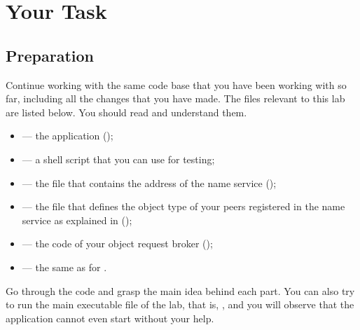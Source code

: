 \documentclass[a4paper]{article}
\begin{document}
\section{Your Task} 
\subsection{Preparation}
Continue working with the same code base that you have been working with so far,
including all the changes that you have made. The files relevant to this lab are
listed below. You should read and understand them.
\begin{itemize}

  \item {} --- the  application (\leave);

  \item {} --- a shell script that you can use for testing;

  \item {} --- the file that
  contains the address of the name service (\leave);

  \item {} --- the file that defines the
  object type of your peers registered in the name service as explained in
   (\fix);

  \item {} --- the code of your object request
  broker (\fix);

  \item {} --- the same as for .

\end{itemize}
Go through the code and grasp the main idea behind each part. You can also try
to run the main executable file of the lab, that is, , and you
will observe that the application cannot even start without your help.
\end{document}
